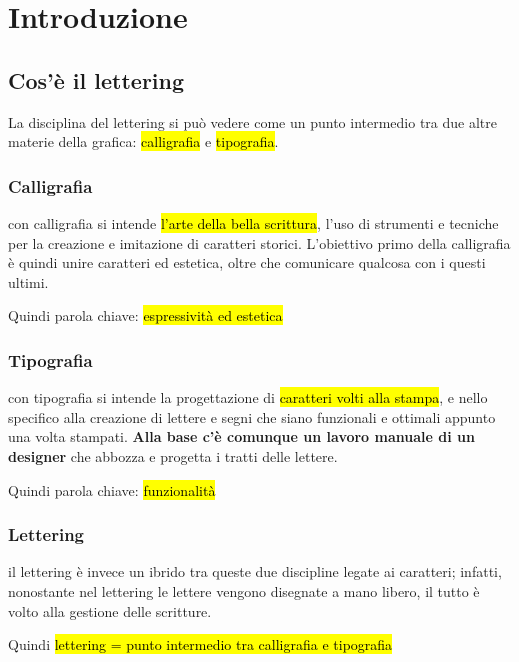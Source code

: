 \chapter{Introduzione}
\section{Cos'è il lettering}
La disciplina del lettering si può vedere come un punto intermedio tra due altre materie della grafica: \hl{calligrafia} e \hl{tipografia}.
\subsection{Calligrafia}
con calligrafia si intende \hl{l'arte della bella scrittura}, l'uso di strumenti e tecniche per la creazione e imitazione di caratteri storici. L'obiettivo primo della calligrafia è quindi unire caratteri ed estetica, oltre che comunicare qualcosa con i questi ultimi.

\begin{mdframed}[style=mystyle,frametitle=]
Quindi parola chiave: \hl{espressività ed estetica}
\end{mdframed}

\subsection{Tipografia}
con tipografia si intende la progettazione di \hl{caratteri volti alla stampa}, e nello specifico alla creazione di lettere e segni che siano funzionali e ottimali appunto una volta stampati. \textbf{Alla base c'è comunque un lavoro manuale di un designer} che abbozza e progetta i tratti delle lettere.

\begin{mdframed}[style=mystyle,frametitle=]
 Quindi parola chiave: \hl{funzionalità}
 \end{mdframed}

 \subsection{Lettering}
il lettering è invece un ibrido tra queste due discipline legate ai caratteri; infatti, nonostante nel lettering le lettere vengono disegnate a mano libero, il tutto è volto alla gestione delle scritture.
\begin{mdframed}[style=mystyle,frametitle=]
 Quindi \hl{lettering = punto intermedio tra calligrafia e tipografia}
 \end{mdframed}


